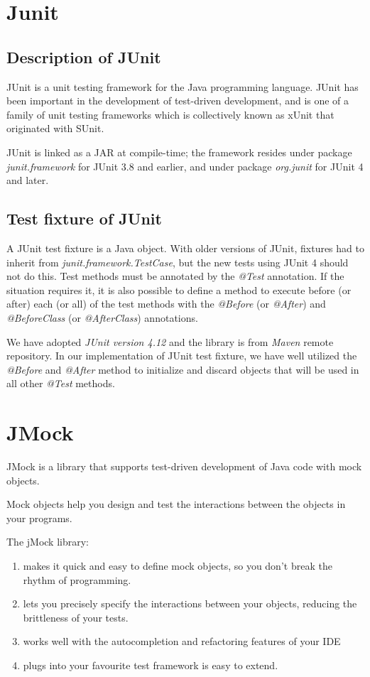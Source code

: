 \documentclass[./report.tex]{subfiles}
\begin{document}
\section{Junit}
\subsection{Description of JUnit}
\par JUnit is a unit testing framework for the Java programming language. JUnit has been important in the development of test-driven development, and is one of a family of unit testing frameworks which is collectively known as xUnit that originated with SUnit.
\par JUnit is linked as a JAR at compile-time; the framework resides under package \emph{ junit.framework} for JUnit 3.8 and earlier, and under package \emph{org.junit} for JUnit 4 and later.
\subsection{Test fixture of JUnit}
A JUnit test fixture is a Java object. With older versions of JUnit, fixtures had to inherit from \emph{junit.framework.TestCase}, but the new tests using JUnit 4 should not do this. Test methods must be annotated by the \emph{@Test} annotation. If the situation requires it, it is also possible to define a method to execute before (or after) each (or all) of the test methods with the \emph{@Before} (or \emph{@After}) and \emph{@BeforeClass} (or \emph{@AfterClass}) annotations.
\par
We have adopted \emph{JUnit version 4.12} and the library is from \emph{Maven} remote repository. In our implementation of JUnit test fixture, we  have well utilized the  \emph{@Before} and \emph{@After} method to initialize and discard objects that will be used in all other \emph{@Test} methods.
\section{JMock}
\par JMock is a library that supports test-driven development of Java code with mock objects.
\par Mock objects help you design and test the interactions between the objects in your programs.

\par The jMock library:
\begin{enumerate} 
\item makes it quick and easy to define mock objects, so you don't break the rhythm of programming.
\item lets you precisely specify the interactions between your objects, reducing the brittleness of your tests.
\item works well with the autocompletion and refactoring features of your IDE
\item plugs into your favourite test framework is easy to extend.
\end{enumerate}
\end{document}
